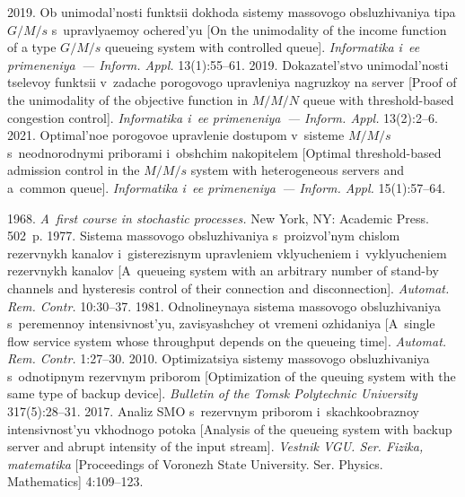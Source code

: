   \begin{multicols}{2}

\renewcommand{\bibname}{\protect\rmfamily References}

{\small\frenchspacing
 {%
 \begin{thebibliography}{9}
   2019. Ob unimodal'nosti funktsii dokhoda 
  sistemy massovogo obsluzhivaniya 
tipa $G/M/s$ s~upravlyaemoy ochered'yu [On the unimodality of the income function of a type 
$G/M/s$ queueing system with controlled queue]. \textit{Informatika i~ee primeneniya~--- Inform. 
Appl.} 13(1):55--61. 
 2019. Dokazatel'stvo unimodal'nosti tselevoy 
funktsii v~zadache porogovogo upravleniya nagruzkoy na server [Proof of the unimodality of the 
objective function in $M/M/N$ queue with threshold-based congestion control]. \textit{Informatika 
i~ee primeneniya~--- Inform. Appl.} 13(2):2--6.
   2021. Optimal'noe porogovoe upravlenie dostupom v~sisteme 
$M/M/s$ s~neodnorodnymi priborami i~obshchim nakopitelem [Optimal threshold-based 
admission control in the $M/M/s$ system with heterogeneous servers and a~common queue]. 
\textit{Informatika i~ee primeneniya~--- Inform. Appl.} 15(1):57--64.

   1968. \textit{A~first course in stochastic processes.} New York, NY:  
Academic Press. 502~p.
   1977. Sistema massovogo obsluzhivaniya s~proizvol'nym chislom 
rezervnykh kanalov i~gisterezisnym upravleniem vklyucheniem i~vyklyucheniem rezervnykh 
kanalov [A~queueing system with an arbitrary number of stand-by channels and hysteresis control 
of their connection and disconnection]. \textit{Automat. Rem. 
Contr.} 10:30--37.
   1981. Odnolineynaya sistema massovogo 
obsluzhivaniya s~peremennoy intensivnost'yu, zavisyashchey ot vremeni ozhidaniya [A~single 
flow service system whose throughput depends on the queueing time]. \textit{Automat. Rem. Contr.} 1:27--30. 
   2010. Op\-ti\-mi\-za\-tsiya sistemy massovogo 
obsluzhivaniya s~od\-no\-tip\-nym re\-zerv\-nym priborom [Optimization of the queuing system with the 
same type of backup device]. \textit{Bulletin 
of the Tomsk Polytechnic University} 317(5):28--31.
   2017. Analiz SMO s~rezervnym 
priborom i~skachkoobraznoy intensivnost'yu vkhodnogo potoka [Analysis of the queueing system 
with backup server and abrupt intensity of the input stream]. \textit{Vestnik VGU. Ser. Fizika, 
matematika} [Proceedings of Voronezh State University. Ser. Physics. Mathematics] 4:109--123.


\end{thebibliography}}}
\end{multicols}
